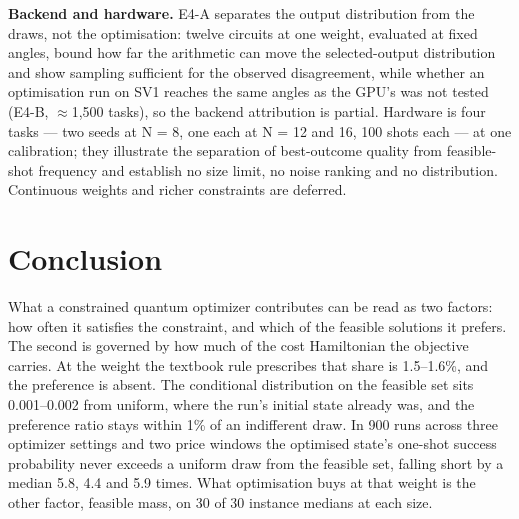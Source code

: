 \documentclass{ieeeaccess}
\begin{document}
\textbf{Backend and hardware.} E4-A separates the output distribution from the draws, not the optimisation: twelve circuits at one weight, evaluated at fixed angles, bound how far the arithmetic can move the selected-output distribution and show sampling sufficient for the observed disagreement, while whether an optimisation run on SV1 reaches the same angles as the GPU's was not tested (E4-B, $\approx$1,500 tasks), so the backend attribution is partial. Hardware is four tasks --- two seeds at N = 8, one each at N = 12 and 16, 100 shots each --- at one calibration; they illustrate the separation of best-outcome quality from feasible-shot frequency and establish no size limit, no noise ranking and no distribution. Continuous weights and richer constraints are deferred.


\section{Conclusion}


What a constrained quantum optimizer contributes can be read as two factors: how often it satisfies the constraint, and which of the feasible solutions it prefers. The second is governed by how much of the cost Hamiltonian the objective carries. At the weight the textbook rule prescribes that share is 1.5--1.6\%, and the preference is absent. The conditional distribution on the feasible set sits 0.001--0.002 from uniform, where the run's initial state already was, and the preference ratio stays within 1\% of an indifferent draw. In 900 runs across three optimizer settings and two price windows the optimised state's one-shot success probability never exceeds a uniform draw from the feasible set, falling short by a median 5.8, 4.4 and 5.9 times. What optimisation buys at that weight is the other factor, feasible mass, on 30 of 30 instance medians at each size.
\end{document}
